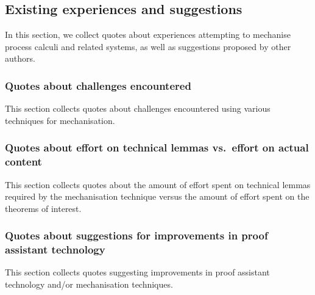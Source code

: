 \subsection{Existing experiences and suggestions}
In this section, we collect quotes about experiences attempting to mechanise process calculi and related systems, as well as suggestions proposed by other authors.

\subsubsection{Quotes about challenges encountered}
This section collects quotes about challenges encountered using various techniques for mechanisation.

\subsubsection{Quotes about effort on technical lemmas vs.\ effort on actual content}
This section collects quotes about the amount of effort spent on technical lemmas required by the mechanisation technique versus the amount of effort spent on the theorems of interest.

\subsubsection{Quotes about suggestions for improvements in proof assistant technology}
This section collects quotes suggesting improvements in proof assistant technology and/or mechanisation techniques.
